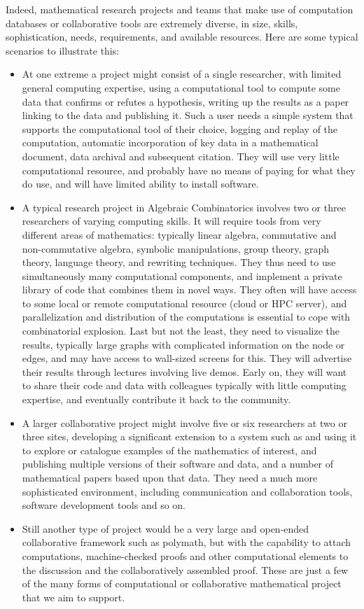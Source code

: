 Indeed, mathematical research projects and teams that make use of
computation databases or collaborative tools are extremely diverse, in
size, skills, sophistication, needs, requirements, and available
resources. Here are some typical scenarios to illustrate this:
\begin{itemize}
\item At one extreme a project might consist of a single researcher, with limited
  general computing expertise, using a computational tool to compute some data
  that confirms or refutes a hypothesis, writing up the results as a paper
  linking to the data and publishing it. Such a user needs a simple system
  that supports the computational tool of their choice, logging and replay of
  the computation, automatic incorporation of key data in a mathematical
  document, data archival and subsequent citation. They will use very little
  computational resource, and probably have no means of paying for what they
  do use, and will have limited ability to install software.

\item A typical research project in Algebraic Combinatorics involves
  two or three researchers of varying computing skills. It will
  require tools from very different areas of mathematics: typically
  linear algebra, commutative and non-commutative algebra, symbolic
  manipulations, group theory, graph theory, language theory, and
  rewriting techniques. They thus need to use simultaneously many
  computational components, and implement a private library of code
  that combines them in novel ways. They often will have access to
  some local or remote computational resource (cloud or HPC server),
  and parallelization and distribution of the computations is
  essential to cope with combinatorial explosion. Last but not the
  least, they need to visualize the results, typically large graphs
  with complicated information on the node or edges, and may have
  access to wall-sized screens for this. They will advertise their
  results through lectures involving live demos. Early on, they will
  want to share their code and data with colleagues typically with
  little computing expertise, and eventually contribute it back to the
  community.

\item A larger collaborative project might involve five or six researchers at two
  or three sites, developing a significant extension to a system such as \Sage
  and using it to explore or catalogue examples of the mathematics of
  interest, and publishing multiple versions of their software and data, and a
  number of mathematical papers based upon that data. They need a much more
  sophisticated environment, including communication and collaboration tools,
  software development tools and so on.

\item Still another type of project would be a very large and open-ended
  collaborative framework such as polymath, but with the capability to attach
  computations, machine-checked proofs and other computational elements to the
  discussion and the collaboratively assembled proof. These are just a few of
  the many forms of computational or collaborative mathematical project that
  we aim to support.
\end{itemize}
